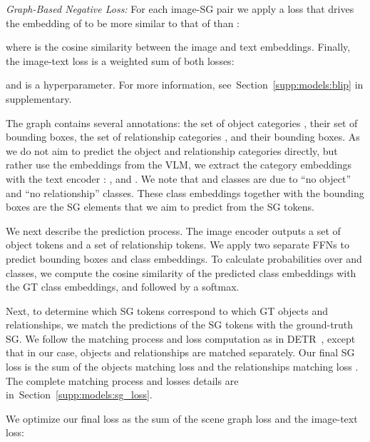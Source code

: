 \documentclass[11pt]{article}
\def\Secref#1{Section~\ref{#1}}
\newcommand{\minisection}[1]{\noindent{\textbf{#1}.}}
\def\Secref#1{Section~\ref{#1}}
\begin{document}
\noindent\textit{Graph-Based Negative Loss:} 
For each image-SG pair we apply a loss that drives the embedding of  to be more similar to that of  than :

where  is the cosine similarity between the image and text embeddings. Finally, the image-text loss is a weighted sum of both losses: 



and  is a hyperparameter. For more information, see~\Secref{supp:models:blip} in supplementary.






\minisection{Scene Graph Loss}
The graph  contains several annotations: the set of object categories , their set of bounding boxes, the set of relationship categories , and their bounding boxes. As we do not aim to predict the object and relationship categories directly, but rather use the embeddings from the VLM, we extract the category embeddings with the text encoder : , and . We note that  and  classes are due to ``no object'' and ``no relationship'' classes. These class embeddings together with the bounding boxes are the SG elements that we aim to predict from the SG tokens.

We next describe the prediction process. The image encoder outputs a set of object tokens and a set of relationship tokens. We apply two separate FFNs to predict bounding boxes and class embeddings. To calculate probabilities over  and  classes, we compute the cosine similarity of the predicted class embeddings with the GT class embeddings,   and  followed by a softmax.














Next, to determine which SG tokens correspond to which GT objects and relationships, we match the predictions of the SG tokens with the ground-truth SG. We follow the matching process and loss computation as in DETR~\cite{detr2020}, except that in our case, objects and relationships are matched separately. Our final SG loss  is the sum of the objects matching loss  and the relationships matching loss . The complete matching process and losses details are in~\Secref{supp:models:sg_loss}.




We optimize our final loss as the sum of the scene graph loss and the image-text loss:
 
\end{document}

